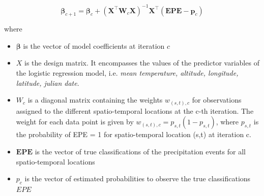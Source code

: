 \documentclass[
  12pt,
]{article}
\begin{document}
\begin{mdframed}[leftline=true, rightline=true, bottomline=false,topline=false, frametitle={Update of Logistic Regression Model Coefficients during iteration c+1}]
\begin{equation}\label{eq:update_model_coefficients}
\boldsymbol{\beta}_{c+1} = \boldsymbol{\beta}_{c} + (\boldsymbol{X}^\top \boldsymbol{W}_{c} \boldsymbol{X})^{-1} \boldsymbol{X}^\top (\boldsymbol{EPE} - \boldsymbol{p}_{c})
\end{equation}
\end{mdframed}

where

\begin{itemize}[label={}]
\item $\boldsymbol{\beta}$ is the vector of model coefficients at iteration $c$
\item $X$ is the design matrix. It encompasses the values of the predictor variables of the logistic regression model, i.e. \textit{mean temperature, altitude, longitude, latitude, julian date}.
\item $W_{c}$ is a diagonal matrix containing the weights $w_{(s,t),c}$ for observations assigned to the different spatio-temporal locations at the c-th iteration. The weight for each data point is given by $w_{(s,t),c} = p_{s,t}(1 - p_{s,t})$, where $p_{s,t}$ is the probability of EPE = 1 for spatio-temporal location (s,t) at iteration c.
\item $\boldsymbol{EPE}$ is the vector of true classifications of the precipitation events for all spatio-temporal locations
\item $p_{c}$ is the vector of estimated probabilities to observe the true classifications $EPE$
\end{itemize}
\end{document}
